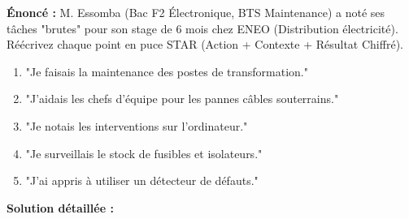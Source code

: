 \documentclass[11pt]{article}
\begin{document}
\begin{exoresolu}
\textbf{Énoncé :} M. Essomba (Bac F2 Électronique, BTS Maintenance) a noté ses tâches "brutes" pour son stage de 6 mois chez ENEO (Distribution électricité). Réécrivez chaque point en puce STAR (Action + Contexte + Résultat Chiffré).

\begin{enumerate}
    \item "Je faisais la maintenance des postes de transformation."
    \item "J'aidais les chefs d'équipe pour les pannes câbles souterrains."
    \item "Je notais les interventions sur l'ordinateur."
    \item "Je surveillais le stock de fusibles et isolateurs."
    \item "J'ai appris à utiliser un détecteur de défauts."
\end{enumerate}

\tcblower
\textbf{Solution détaillée :}


\end{exoresolu}
\end{document}
